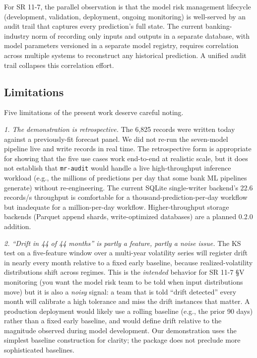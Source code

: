 For SR 11-7, the parallel observation is that the model risk management lifecycle (development, validation, deployment, ongoing monitoring) is well-served by an audit trail that captures every prediction's full state. The current banking-industry norm of recording only inputs and outputs in a separate database, with model parameters versioned in a separate model registry, requires correlation across multiple systems to reconstruct any historical prediction. A unified audit trail collapses this correlation effort.

\subsection{Limitations}\label{sec:limitations}

Five limitations of the present work deserve careful noting.

\textit{1. The demonstration is retrospective.} The 6,825 records were written today against a previously-fit forecast panel. We did not re-run the seven-model pipeline live and write records in real time. The retrospective form is appropriate for showing that the five use cases work end-to-end at realistic scale, but it does not establish that \texttt{mr-audit} would handle a live high-throughput inference workload (e.g., the millions of predictions per day that some bank ML pipelines generate) without re-engineering. The current SQLite single-writer backend's 22.6 records/s throughput is comfortable for a thousand-prediction-per-day workflow but inadequate for a million-per-day workflow. Higher-throughput storage backends (Parquet append shards, write-optimized databases) are a planned 0.2.0 addition.

\textit{2. ``Drift in 44 of 44 months'' is partly a feature, partly a noise issue.} The KS test on a five-feature window over a multi-year volatility series will register drift in nearly every month relative to a fixed early baseline, because realized-volatility distributions shift across regimes. This is the \emph{intended} behavior for SR 11-7 §V monitoring (you want the model risk team to be told when input distributions move) but it is also a \emph{noisy} signal: a team that is told ``drift detected'' every month will calibrate a high tolerance and miss the drift instances that matter. A production deployment would likely use a rolling baseline (e.g., the prior 90 days) rather than a fixed early baseline, and would define drift relative to the magnitude observed during model development. Our demonstration uses the simplest baseline construction for clarity; the package does not preclude more sophisticated baselines.


